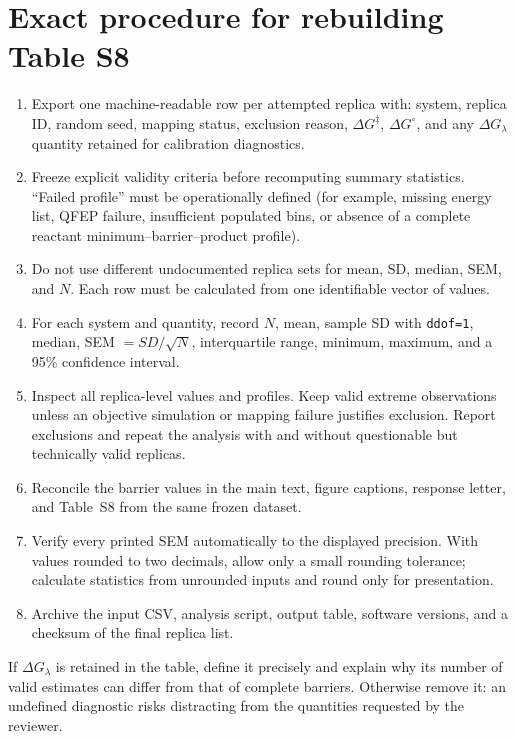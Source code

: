 \documentclass[11pt,a4paper]{article}
\begin{document}
\section{Exact procedure for rebuilding Table S8}

\begin{enumerate}
  \item Export one machine-readable row per attempted replica with: system, replica ID, random seed, mapping status, exclusion reason, $\Delta G^{\ddagger}$, $\Delta G^{\circ}$, and any $\Delta G_{\lambda}$ quantity retained for calibration diagnostics.
  \item Freeze explicit validity criteria before recomputing summary statistics. ``Failed profile'' must be operationally defined (for example, missing energy list, QFEP failure, insufficient populated bins, or absence of a complete reactant minimum--barrier--product profile).
  \item Do not use different undocumented replica sets for mean, SD, median, SEM, and $N$. Each row must be calculated from one identifiable vector of values.
  \item For each system and quantity, record $N$, mean, sample SD with \texttt{ddof=1}, median, SEM $=SD/\sqrt{N}$, interquartile range, minimum, maximum, and a 95\% confidence interval.
  \item Inspect all replica-level values and profiles. Keep valid extreme observations unless an objective simulation or mapping failure justifies exclusion. Report exclusions and repeat the analysis with and without questionable but technically valid replicas.
  \item Reconcile the barrier values in the main text, figure captions, response letter, and Table~S8 from the same frozen dataset.
  \item Verify every printed SEM automatically to the displayed precision. With values rounded to two decimals, allow only a small rounding tolerance; calculate statistics from unrounded inputs and round only for presentation.
  \item Archive the input CSV, analysis script, output table, software versions, and a checksum of the final replica list.
\end{enumerate}

If $\Delta G_{\lambda}$ is retained in the table, define it precisely and explain why its number of valid estimates can differ from that of complete barriers. Otherwise remove it: an undefined diagnostic risks distracting from the quantities requested by the reviewer.
\end{document}
